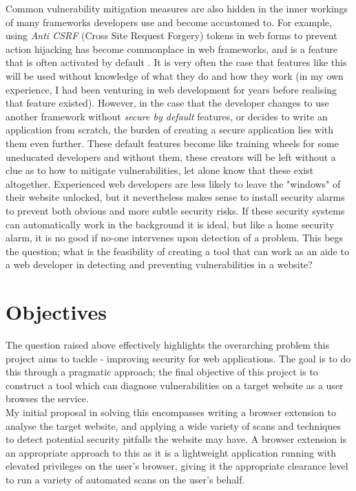 Common vulnerability mitigation measures are also hidden in the inner workings of many frameworks developers use and become accustomed to. 
For example, using \textit{Anti CSRF} (Cross Site Request Forgery) tokens in web forms to prevent action hijacking has become commonplace in web frameworks, and is a feature that is often activated by default \cite{djangoCSRF, rubyOnRailsCSRF, laravelCSRF}.
It is very often the case that features like this will be used without knowledge of what they do and how they work (in my own experience, I had been venturing in web development for years before realising that feature existed). 
However, in the case that the developer changes to use another framework without \textit{secure by default} features, or decides to write an application from scratch, the burden of creating a secure application lies with them even further. 
These default features become like training wheels for some uneducated developers and without them, these creators will be left without a clue as to how to mitigate vulnerabilities, let alone know that these exist altogether. 
Experienced web developers are less likely to leave the "windows" of their website unlocked, but it nevertheless makes sense to install security alarms to prevent both obvious and more subtle security risks.
If these security systems can automatically work in the background it is ideal, but like a home security alarm, it is no good if no-one intervenes upon detection of a problem. 
This begs the question; what is the feasibility of creating a tool that can work as an aide to a web developer in detecting and preventing vulnerabilities in a website? \\

\section{Objectives}
The question raised above effectively highlights the overarching problem this project aims to tackle - improving security for web applications. The goal is to do this through a pragmatic approach; the final objective of this project is to construct a tool which can diagnose vulnerabilities on a target website as a user browses the service.  \\

My initial proposal in solving this encompasses writing a browser extension to analyse the target website, and applying a wide variety of scans and techniques to detect potential security pitfalls the website may have.
A browser extension is an appropriate approach to this as it is a lightweight application running with elevated privileges on the user's browser, giving it the appropriate clearance level to run a variety of automated scans on the user's behalf.  \\



